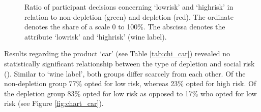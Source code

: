 \begin{figure}[!h]
\begin{floatrow}
{\begin{tikzpicture}[text depth=3pt]
		\end{tikzpicture}
}{%
  \caption{Ratio of participant decisions concerning ‘lowrisk’ and ‘highrisk’ in relation to non-depletion (green) and depletion (red). The ordinate denotes the share of a scale 0 to 100\%. The abscissa denotes the attribute ‘lowrisk’ and ‘highrisk’ (wine label).}\label{fig:chart_wine}%
}
\end{floatrow}
\end{figure}
Results regarding the product ‘car’ (see Table \ref{tab:chi_car}) revealed no statistically significant relationship between the type of depletion and social risk (). Similar to ‘wine label’, both groups differ scarcely from each other. Of the non-depletion group 77\% opted for low risk, whereas 23\% opted for high risk. Of the depletion group 83\% opted for low risk as opposed to 17\% who opted for low risk (see Figure \ref{fig:chart_car}). 

